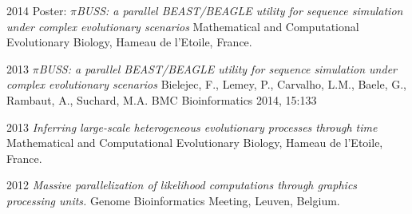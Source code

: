 \documentclass[a4paper, oneside, final]{scrartcl}
\newenvironment{lyxlist}[1]
{\begin{list}{}
{\settowidth{\labelwidth}{#1}
 \setlength{\leftmargin}{\labelwidth}
 \addtolength{\leftmargin}{\labelsep}
 \renewcommand{\makelabel}[1]{##1\hfil}}}
{\end{list}}
\newcommand{\noun}[1]{\textsc{#1}}
\begin{document}
\begin{center}
\begin{lyxlist}{00.00.0000}

\item [{\noun{\scriptsize 2014}}] Poster: \emph{$\pi$BUSS: a parallel BEAST/BEAGLE utility for sequence simulation under complex evolutionary scenarios}
Mathematical and Computational Evolutionary Biology, Hameau de l'Etoile, France.


\item [{\noun{\scriptsize 2013}}] \emph{$\pi$BUSS: a parallel BEAST/BEAGLE utility for sequence simulation under complex evolutionary scenarios}
Bielejec, F., Lemey, P., Carvalho, L.M., Baele, G., Rambaut, A., Suchard, M.A.
BMC Bioinformatics 2014, 15:133

\item [{\noun{\scriptsize 2013}}] \emph{Inferring large-scale heterogeneous evolutionary processes through time}
Mathematical and Computational Evolutionary Biology, Hameau de l'Etoile, France.



\item [{\noun{\scriptsize 2012}}] \emph{Massive parallelization of likelihood computations through graphics processing units.}
Genome Bioinformatics Meeting, Leuven, Belgium.



\end{lyxlist}
\end{center}
\end{document}
